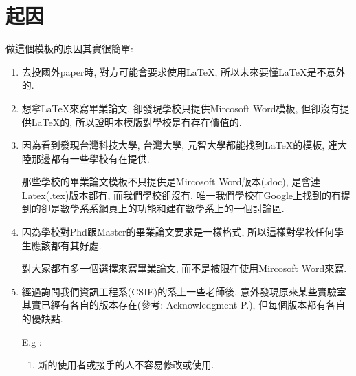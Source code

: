 
\section{起因}

做這個模板的原因其實很簡單:

\begin{enumerate}
  \item
  {
    去投國外paper時, 對方可能會要求使用LaTeX, 所以未來要懂LaTeX是不意外的.
  } %

  \item
  {
    想拿LaTeX來寫畢業論文, 卻發現學校只提供Mircosoft Word模板, 但卻沒有提供LaTeX的, 所以證明本模版對學校是有存在價值的.
  } %

  \item
  {
    因為看到發現台灣科技大學\cite{web:latex:template:ntust}, 台灣大學\cite{web:latex:template:ntu}, 元智大學\cite{web:latex:template:ntust}都能找到LaTeX的模板, 連大陸那邊都有一些學校有在提供.

    那些學校的畢業論文模板不只提供是Mircosoft Word版本(.doc), 是會連Latex(.tex)版本都有, 而我們學校卻沒有. 唯一我們學校在Google上找到的有提到的卻是數學系系網頁上的功能\cite{web:latex:ncku_math_introduction}和建在數學系上的一個討論區\cite{web:latex:ncku_math_forum}.
  } %

  \item
  {
    因為學校對Phd跟Master的畢業論文要求是一樣格式, 所以這樣對學校任何學生應該都有其好處.

    對大家都有多一個選擇來寫畢業論文, 而不是被限在使用Mircosoft Word來寫.
  } %

  \item
  {
    經過詢問我們資訊工程系(CSIE)的系上一些老師後, 意外發現原來某些實驗室其實已經有各自的版本存在(參考: Acknowledgment P.\pageref{acknowledgments-chi}), 但每個版本都有各自的優缺點.

    E.g :
    \begin{enumerate}

      \item
      {
        新的使用者或接手的人不容易修改或使用.
      } %


\end{enumerate}}
\end{enumerate}
